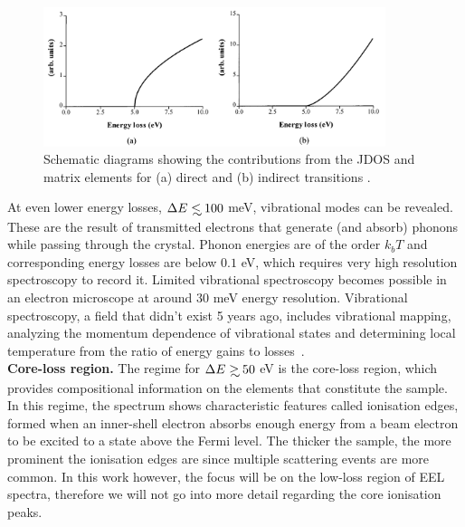 \begin{figure}[h]
    \centering
    \includegraphics[width=100mm]{plots/bandgap.png}
    \caption{Schematic diagrams showing the contributions from the JDOS and matrix elements for (a) direct and (b) indirect transitions \cite{rafferty}.}
    \label{fig:bandgap}
\end{figure}

At even lower energy losses, $\Delta E \lsim 100$ meV, vibrational modes can be revealed. 
These are the result of transmitted electrons that generate (and absorb) phonons 
while passing through the crystal. 
%
Phonon energies are of the order $k_bT$ and corresponding energy losses are below $0.1$ eV, 
which requires very high resolution spectroscopy to record it. 
%
Limited vibrational spectroscopy becomes possible in an electron microscope at around 30 meV 
energy resolution. 
%
Vibrational spectroscopy, a field that didn't exist 5 years ago, includes vibrational mapping, 
analyzing the momentum dependence of vibrational states and determining local
temperature from the ratio of energy gains to losses~\cite{krivanek}.\\

{\bf Core-loss region.} The regime for $\Delta E \gsim 50$ eV is the core-loss region,
which provides compositional information
on the elements that constitute the sample. 
%
In this regime, the spectrum shows characteristic features called ionisation edges, 
formed when an inner-shell electron absorbs enough energy from a beam electron 
to be excited to a state above the Fermi level. 
%
The thicker the sample, the more prominent the ionisation edges are 
since multiple scattering events are more common. 
%
In this work however, the focus will be on the low-loss region of EEL spectra, 
therefore we will not go into more detail regarding the core ionisation peaks.



